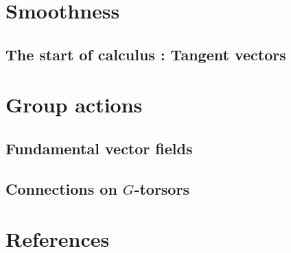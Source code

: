 \documentclass{article}
\begin{document}
\section{Smoothness}
  \subsection{The start of calculus : Tangent vectors}

\section{Group actions}
  \subsection{Fundamental vector fields}
  \subsection{Connections on $G$-torsors}


\section{References}
\printbibliography
\end{document}
